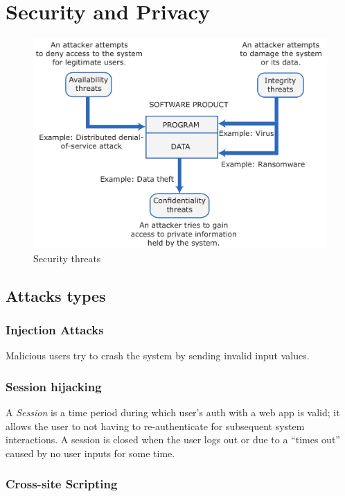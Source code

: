 \chapter{Security and Privacy}
\begin{figure}[htbp]
   \centering
   \includegraphics{images/security_threats.png}
   \caption{Security threats}
   \label{fig:security_threats}
\end{figure}

\section{Attacks types}

\subsection{Injection Attacks}
Malicious users try to crash the system by sending invalid input values.

\subsection{Session hijacking}
A \textit{Session} is a time period during which user's auth with a web app is valid;
it allows the user to not having to re-authenticate for subsequent system interactions.
A session is closed when the user logs out or due to a “times out” caused by
no user inputs for some time. 

\subsection{Cross-site Scripting}

